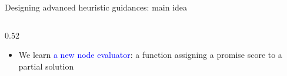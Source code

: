\documentclass{beamer}
\begin{document}
\begin{frame}{Designing advanced heuristic guidances: main idea}
\begin{columns}[T,totalwidth=\textwidth]
\begin{column}{0.52\textwidth}
\begin{itemize}
  \item We learn \textcolor{blue}{a new node evaluator}: a function assigning a promise score to a partial solution
\end{itemize}
\vspace{0.15cm}
\end{column}


\end{columns}
\end{frame}
\end{document}
